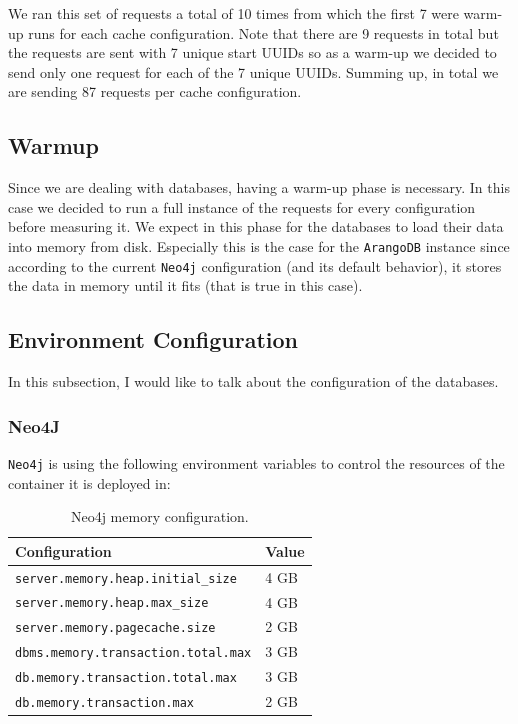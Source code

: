 \documentclass[11pt,a4paper]{article}
\begin{document}
We ran this set of requests a total of 10 times from which the first 7 were warm-up runs for each cache configuration. Note that there are 9 requests in total but the requests are sent with 7 unique start UUIDs so as a warm-up we decided to send only one request for each of the 7 unique UUIDs. Summing up, in total we are sending 87 requests per cache configuration.

\subsection{Warmup}

Since we are dealing with databases, having a warm-up phase is necessary. In this case we decided to run a full instance of the requests for every configuration before measuring it. We expect in this phase for the databases to load their data into memory from disk. Especially this is the case for the \texttt{ArangoDB} instance since according to the current \texttt{Neo4j} configuration (and its default behavior), it stores the data in memory until it fits (that is true in this case).

\subsection{Environment Configuration}

In this subsection, I would like to talk about the configuration of the databases. 


\subsubsection{Neo4J} 

\texttt{Neo4j} is using the following environment variables to control the resources of the container it is deployed in:

\begin{table}[htbp]
    \centering
    \caption{Neo4j memory configuration.}
    \label{tab:neo4j-memory-config}
    \begin{tabular}{ll}
        \hline
        \textbf{Configuration} & \textbf{Value} \\
        \hline
        \texttt{server.memory.heap.initial\_size}      & 4 GB \\
        \texttt{server.memory.heap.max\_size}          & 4 GB \\
        \texttt{server.memory.pagecache.size}          & 2 GB \\
        \texttt{dbms.memory.transaction.total.max}     & 3 GB \\
        \texttt{db.memory.transaction.total.max}       & 3 GB \\
        \texttt{db.memory.transaction.max}             & 2 GB \\
        \hline
    \end{tabular}
\end{table}
\end{document}
